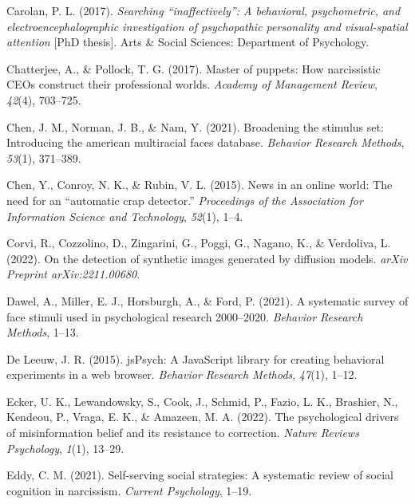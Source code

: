 \documentclass[
  man,floatsintext]{apa6}
\newlength{\cslhangindent}
\newlength{\cslentryspacingunit} %
\newenvironment{CSLReferences}[2] %
 {%
  \setlength{\parindent}{0pt}
  \ifodd #1
  \let\oldpar\par
  \def\par{\hangindent=\cslhangindent\oldpar}
  \fi
  \setlength{\parskip}{#2\cslentryspacingunit}
 }%
 {}
\begin{document}
\begin{CSLReferences}{1}{0}
\leavevmode{}%
Carolan, P. L. (2017). \emph{Searching {``inaffectively''}: A behavioral, psychometric, and electroencephalographic investigation of psychopathic personality and visual-spatial attention} {[}PhD thesis{]}. Arts \& Social Sciences: Department of Psychology.

\leavevmode{}%
Chatterjee, A., \& Pollock, T. G. (2017). Master of puppets: How narcissistic CEOs construct their professional worlds. \emph{Academy of Management Review}, \emph{42}(4), 703--725.

\leavevmode{}%
Chen, J. M., Norman, J. B., \& Nam, Y. (2021). Broadening the stimulus set: Introducing the american multiracial faces database. \emph{Behavior Research Methods}, \emph{53}(1), 371--389.

\leavevmode{}%
Chen, Y., Conroy, N. K., \& Rubin, V. L. (2015). News in an online world: The need for an {``automatic crap detector.''} \emph{Proceedings of the Association for Information Science and Technology}, \emph{52}(1), 1--4.

\leavevmode{}%
Corvi, R., Cozzolino, D., Zingarini, G., Poggi, G., Nagano, K., \& Verdoliva, L. (2022). On the detection of synthetic images generated by diffusion models. \emph{arXiv Preprint arXiv:2211.00680}.

\leavevmode{}%
Dawel, A., Miller, E. J., Horsburgh, A., \& Ford, P. (2021). A systematic survey of face stimuli used in psychological research 2000--2020. \emph{Behavior Research Methods}, 1--13.

\leavevmode{}%
De Leeuw, J. R. (2015). jsPsych: A JavaScript library for creating behavioral experiments in a web browser. \emph{Behavior Research Methods}, \emph{47}(1), 1--12.

\leavevmode{}%
Ecker, U. K., Lewandowsky, S., Cook, J., Schmid, P., Fazio, L. K., Brashier, N., Kendeou, P., Vraga, E. K., \& Amazeen, M. A. (2022). The psychological drivers of misinformation belief and its resistance to correction. \emph{Nature Reviews Psychology}, \emph{1}(1), 13--29.

\leavevmode{}%
Eddy, C. M. (2021). Self-serving social strategies: A systematic review of social cognition in narcissism. \emph{Current Psychology}, 1--19.


\end{CSLReferences}
\end{document}
